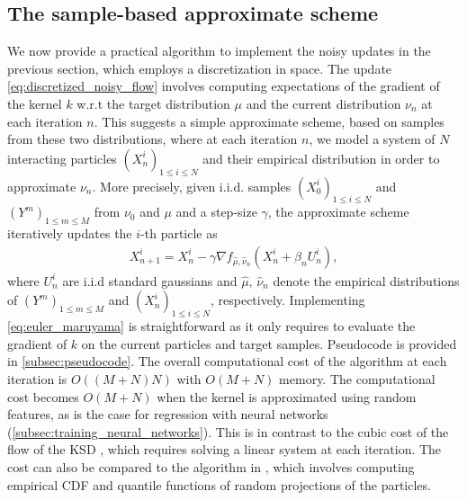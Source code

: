 
\subsection{The sample-based approximate scheme}\label{sec:sample_based}

We now provide a practical algorithm to implement %
the noisy updates in the previous section,
which employs a discretization in space.
The update \cref{eq:discretized_noisy_flow} involves computing expectations of the gradient of the kernel $k$ w.r.t the target distribution $\mu$ and the current distribution $\nu_n$ at each iteration $n$. This suggests a simple approximate scheme, based on samples from these two distributions, where %
at each iteration $n$, we model a system of $N$ interacting particles $(X_n^i)_{1\leq i\leq N}$  and their empirical distribution in order to approximate $\nu_n$. 
More precisely, given i.i.d. samples $(X^i_0)_{1\leq i\leq N}$ and $(Y^{m})_{1\leq m\leq M}$ from $\nu_0$ and $\mu$ and a step-size $\gamma$, the approximate scheme iteratively updates the $i$-th particle as
\begin{align}\label{eq:euler_maruyama}
X_{n+1}^{i} = X_n^i -\gamma \nabla f_{\hat{\mu},\hat{\nu}_n}(X_n^i+\beta_n U_n^i),
\end{align}
where $U_{n}^{i}$ are i.i.d standard gaussians and $\hat{\mu},\,\hat{\nu}_n$ denote the empirical distributions of $(Y^{m})_{1\leq m\leq M}$ and $(X^i_n)_{1\leq i\leq N}$, respectively. %
Implementing \cref{eq:euler_maruyama} is straightforward as it only requires to evaluate the gradient of $k$ on the current particles and target samples. Pseudocode is provided in \cref{subsec:pseudocode}. 
The overall computational cost of the algorithm at each iteration is $O((M+N)N)$ with $O(M+N)$ memory. The computational cost becomes  $O(M+N)$ when the kernel is approximated using random features, as  is the case for regression with neural networks (\cref{subsec:training_neural_networks}). 
This is in contrast to the cubic cost of the flow of the KSD \cite{Mroueh:2019}, which requires solving a linear system at each iteration. The cost can also be compared to the algorithm in  \cite{csimcsekli2018sliced}, which involves computing empirical CDF and quantile functions of random projections of the particles.

